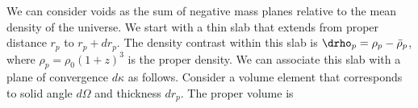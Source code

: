 We can consider voids as the sum of negative mass planes relative to the mean density of the universe. We start with a thin slab that extends from proper distance $r_p$ to $r_p+dr_p$.  The density contrast within this slab is $\drho_p = \rho_p - \bar\rho_p$, where $\rho_p = \rho_0 (1+z)^3$ is the proper density.  We can associate this slab with a plane of convergence $d\kappa$ as follows.  Consider a volume element that corresponds to solid angle $d\Omega$ and thickness $dr_p$.  The proper volume is
  
  